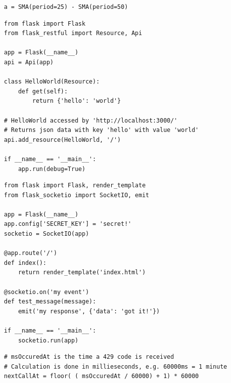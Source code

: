 \begin{code}
\label{code:rel:dev_lib:backtrader:sma_diff}
\begin{verbatim}
a = SMA(period=25) - SMA(period=50)
\end{verbatim}
\end{code}


\begin{code}
\label{code:rel:dev_lib:flask:flask_restful}
\begin{verbatim}
from flask import Flask
from flask_restful import Resource, Api

app = Flask(__name__)
api = Api(app)

class HelloWorld(Resource):
    def get(self):
        return {'hello': 'world'}

# HelloWorld accessed by 'http://localhost:3000/'
# Returns json data with key 'hello' with value 'world'
api.add_resource(HelloWorld, '/')

if __name__ == '__main__':
    app.run(debug=True)
\end{verbatim}
\end{code}


\begin{code}
\label{code:rel:dev_lib:flask:flask_socketio}
\begin{verbatim}
from flask import Flask, render_template
from flask_socketio import SocketIO, emit
    
app = Flask(__name__)
app.config['SECRET_KEY'] = 'secret!'
socketio = SocketIO(app)

@app.route('/')
def index():
    return render_template('index.html')

@socketio.on('my event')
def test_message(message):
    emit('my response', {'data': 'got it!'})

if __name__ == '__main__':
    socketio.run(app)
\end{verbatim}
\end{code}


\begin{code}
\label{code:impl:exchange_data:calc_next_interval}
\begin{verbatim}
# msOccuredAt is the time a 429 code is received
# Calculation is done in millieseconds, e.g. 60000ms = 1 minute
nextCallAt = floor( ( msOccuredAt / 60000) + 1) * 60000
\end{verbatim}
\end{code}



